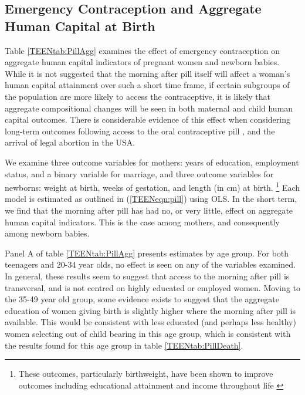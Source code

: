 \subsection{Emergency Contraception and Aggregate Human Capital at Birth}
Table \ref{TEENtab:PillAgg} examines the effect of emergency contraception on
aggregate human capital indicators of pregnant women and newborn babies.  While
it is not suggested that the morning after pill itself will affect a woman's
human capital attainment over such a short time frame, if certain subgroups of 
the population are more likely to access the contraceptive, it is likely that 
aggregate compositional changes will be seen in both maternal and child human 
capital outcomes.  There is considerable evidence of this effect when considering
long-term outcomes following access to the oral contraceptive pill 
\citep{Baileyetal2012,OltmansHungerman2012}, and the arrival of legal abortion 
\citep{Whitaker2011,Ananatetal2009} in the USA.

We examine three outcome variables for mothers: years of education, employment 
status, and a binary variable for marriage, and three outcome variables for 
newborns: weight at birth, weeks of gestation, and length (in cm) at birth.%
\footnote{These outcomes, particularly birthweight, have been shown to improve 
outcomes including educational attainment and income throughout life 
\citep{BehrmanRosenzweig2004}}  Each model is estimated as outlined in 
(\ref{TEENeqn:pill}) using OLS.  In the short term, we find that the morning 
after pill has had no, or very little, effect on aggregate human capital 
indicators. This is the case among mothers, and consequently among newborn 
babies.

Panel A of table \ref{TEENtab:PillAgg} presents estimates by age group.  For
both teenagers and 20-34 year olds, no effect is seen on any of the variables
examined. In general, these results seem to suggest that access to the morning 
after pill is transversal, and is not centred on highly educated or employed 
women.  Moving to the 35-49 year old group, some evidence exists to suggest
that the aggregate education of women giving birth is slightly higher where
the morning after pill is available.  This would be consistent with less
educated (and perhaps less healthy) women selecting out of child bearing in
this age group, which is consistent with the results found for this age group
in table \ref{TEENtab:PillDeath}.

